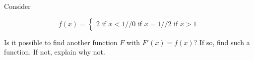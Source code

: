 \documentclass{ximera}
\author{Steven Gubkin}
\begin{document}
\begin{exercise}


Consider

\[
f(x) = \begin{cases}
	2 \text{ if } x<1//
	0 \text{ if } x =1//
	2 \text{ if } x>1

\end{cases}
\]

Is it possible to find another function $F$ with $F'(x) = f(x)$?  If so, find such a function.  If not, explain why not.

\end{exercise}
\end{document}
